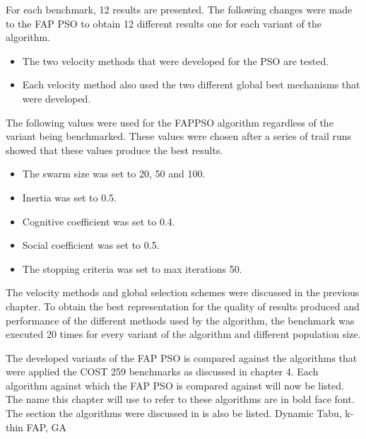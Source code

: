For each benchmark, 12 results are presented. The following changes were made to the FAP PSO to obtain 12 different results one for each variant of the algorithm.
\begin{itemize}
\item The two velocity methods that were developed for the PSO are tested.
\item Each velocity method also used the two different global best mechanisms that were developed.
\end{itemize}
The following values were used for the FAPPSO algorithm regardless of the variant being benchmarked. These values were chosen after a series of trail runs showed that these values produce the best results.
\begin{itemize}
\item The swarm size was set to 20, 50 and 100.
\item Inertia was set to 0.5.
\item Cognitive coefficient was set to 0.4.
\item Social coefficient was set to 0.5.
\item The stopping criteria was set to max iterations 50.
\end{itemize}
The velocity methods and global selection schemes were discussed in the previous chapter. To obtain the best representation for the quality of results produced and performance of the different methods used by the algorithm, the benchmark was executed 20 times for every variant of the algorithm and different population size.

The developed variants of the FAP PSO is compared against the algorithms that were applied the \gls{COST} 259 benchmarks as discussed in chapter 4. Each algorithm against which the FAP PSO is compared against will now be listed. The name this chapter will use to refer to these algorithms are in bold face font. The section the algorithms were discussed in is also be listed. Dynamic Tabu, k-thin FAP, GA

